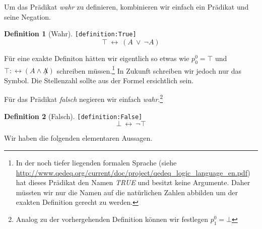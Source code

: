\documentclass[a4paper,german,10pt,twoside]{book}
\theoremstyle{definition}
\newtheorem{defn}{Definition}
\theoremstyle{remark}
\begin{document}
\par
Um das Pr{\"a}dikat \emph{wahr} zu definieren, kombinieren wir einfach ein Pr{\"a}dikat und seine Negation.

\begin{defn}[Wahr]
\label{definition:True} \hypertarget{definition:True}{}
{\tt \tiny [\verb]definition:True]]}
$$\top\ \leftrightarrow\ (A\ \lor\ \neg A)$$

\end{defn}

F{\"u}r eine exakte Definiton h{\"a}tten wir eigentlich so etwas wie $p^0_0 = \top$ und $\top :\leftrightarrow (A \wedge \not A)$ schreiben m{\"u}ssen.\footnote{In der noch tiefer liegenden formalen Sprache (siehe  \url{http://www.qedeq.org/current/doc/project/qedeq_logic_language_en.pdf}) hat dieses Pr{\"a}dikat den Namen \emph{TRUE} und besitzt keine Argumente. Daher m{\"u}ssten wir nur die Namen auf die nat{\"u}rlichen Zahlen abbilden um der exakten Definition gerecht zu werden.} In Zukunft schreiben wir jedoch nur das Symbol. Die Stellenzahl sollte aus der Formel ersichtlich sein.


\par
F{\"u}r das Pr{\"a}dikat \emph{falsch} negieren wir einfach \emph{wahr}.\footnote{Analog zu der vorhergehenden Definition k{\"o}nnen wir festlegen $p^0_1 = \bot$}

\begin{defn}[Falsch]
\label{definition:False} \hypertarget{definition:False}{}
{\tt \tiny [\verb]definition:False]]}
$$\bot\ \leftrightarrow\ \neg \top$$

\end{defn}


\par
Wir haben die folgenden elementaren Aussagen.
\end{document}

